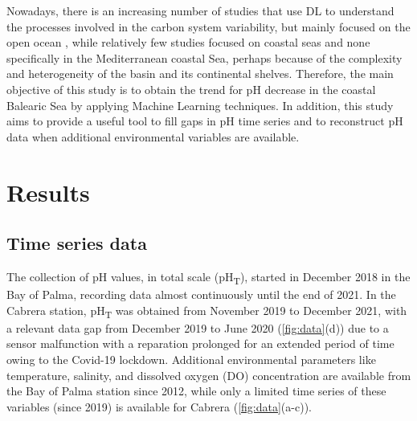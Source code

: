Nowadays, there is an increasing number of studies that use  DL to
understand the processes involved in the carbon system variability, but mainly
focused on the open ocean \cite{Fourrier2020,Friedrich2009,Bittig2018,
    Landschützer2013,Broullon2019}, while relatively few studies focused on
coastal
seas \cite{Broullon2021,Contractor2021} and none specifically in the
Mediterranean coastal Sea, perhaps because of the complexity and heterogeneity
of the basin and its continental shelves. Therefore, the main objective of this
study is to obtain the trend for pH decrease in the coastal Balearic Sea by
applying Machine Learning techniques. In addition, this study aims to provide a
useful tool to fill gaps in pH time series and to reconstruct pH data when
additional environmental variables are available.

\section{Results}
\subsection{Time series data}

The collection of pH values, in total scale (pH\textsubscript{T}), started
in December 2018 in the Bay of Palma, recording data almost continuously until
the end of 2021. In the Cabrera station, pH\textsubscript{T} was obtained from
November 2019 to December 2021, with a relevant data gap from December 2019 to
June 2020 (\cref{fig:data}(d)) due to a sensor malfunction with a reparation
prolonged for an extended period of time owing to the Covid-19 lockdown.
Additional environmental parameters like temperature, salinity, and dissolved
oxygen (DO) concentration are available from the Bay of Palma station since
2012, while only a limited time series of these variables (since 2019) is
available for Cabrera (\cref{fig:data}(a-c)).

